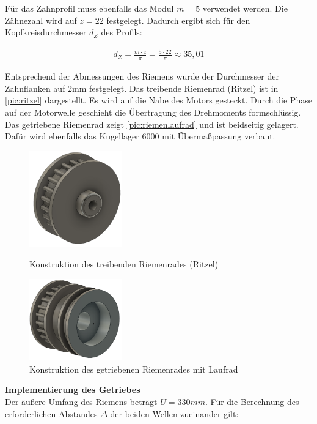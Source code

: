  Für das Zahnprofil muss ebenfalls das Modul $m=5$ verwendet werden. Die Zähnezahl wird auf $z=22$ festgelegt. Dadurch ergibt sich für den Kopfkreisdurchmesser $d_Z$ des Profils: 
 
 \begin{align}
 	d_Z =  \frac{m \cdot z}{\pi} = \frac{5 \cdot 22}{\pi} \approx 35,01
 \end{align}


Entsprechend der Abmessungen des Riemens wurde der Durchmesser der Zahnflanken auf 2mm festgelegt.  Das treibende Riemenrad (Ritzel) ist in \autoref{pic:ritzel} dargestellt. Es wird auf die Nabe des Motors gesteckt. Durch die Phase auf der Motorwelle geschieht die Übertragung des Drehmoments formschlüssig.  Das getriebene Riemenrad zeigt \autoref{pic:riemenlaufrad} und ist beidseitig gelagert. Dafür wird ebenfalls das Kugellager 6000 mit Übermaßpassung verbaut.  
 

\begin{figure}[h]
	\centering
	\begin{minipage}[t]{0.45\linewidth}
		\centering
		\includegraphics[width=4cm]{ritzel.png}
		\caption{Konstruktion des treibenden Riemenrades (Ritzel)}
		\label{pic:ritzel}
	\end{minipage}
	\hfil	
	\begin{minipage}[t]{0.45\linewidth}
		\centering
		\includegraphics[width=4cm]{riemenlaufrad.png}
		\caption{Konstruktion des getriebenen Riemenrades mit Laufrad}
		\label{pic:riemenlaufrad}
	\end{minipage}	
\end{figure}



\newpage


\textbf{Implementierung des Getriebes}\\
Der äußere Umfang des Riemens beträgt $U = 330mm$. Für die Berechnung des erforderlichen Abstandes $\Delta$ der beiden Wellen zueinander gilt:


